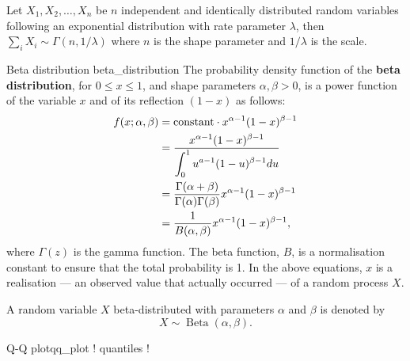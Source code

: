 Let $X_1, X_2, \ldots, X_n$ be $n$ independent and identically distributed random variables following an exponential distribution with rate parameter $\lambda$, then $\sum_i X_i \sim \Gamma(n, 1/\lambda)$ where $n$ is the shape parameter and $1/\lambda$ is the scale.

\begin{definition}{Beta distribution \cite{wikipedia_beta_distribution}}{beta_distribution}
	The probability density function of the \textbf{beta distribution}, for $0 \leq x \leq 1$, and shape parameters $\alpha, \beta > 0$, is a power function of the variable $x$ and of its reflection $(1 - x)$ as follows:
	\begin{align*}
		f(x; \alpha, \beta)
		&= \text{constant} \cdot x^{\alpha - 1} (1 - x)^{\beta - 1} \\
		&= \frac{\displaystyle x^{\alpha - 1} (1 - x)^{\beta - 1}}{\displaystyle \int_0^1 u^{a - 1} (1 - u)^{\beta - 1} du} \\
		&= \frac{\Gamma(\alpha + \beta)}{\Gamma(\alpha) \Gamma(\beta)}
			x^{\alpha - 1} (1 - x)^{\beta - 1} \\
		&= \frac{1}{B(\alpha, \beta)}
			x^{\alpha - 1} (1 - x)^{\beta - 1} ,
	\end{align*}
	where $\Gamma(z)$ is the gamma function. The beta function, $B$, is a normalisation constant to ensure that the total probability is 1. In the above equations, $x$ is a realisation --- an observed value that actually occurred --- of a random process $X$.

	A random variable $X$ beta-distributed with parameters $\alpha$ and $\beta$ is denoted by
	$$ X \sim \operatorname{Beta}(\alpha, \beta) . $$
\end{definition}

\begin{definition}{Q-Q plot}{qq_plot}
	! quantiles !
\end{definition}